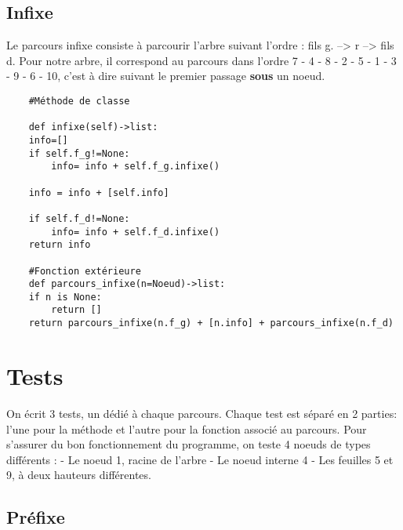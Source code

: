 \documentclass{article}
\begin{document}
\subsection{Infixe}
Le parcours infixe consiste à parcourir l'arbre suivant l'ordre : fils g. --> r --> fils d.
 Pour notre arbre, il correspond au parcours dans 
 l’ordre 7 - 4 - 8 - 2 - 5 - 1 - 3 - 9 - 6 - 10,
 c'est à dire suivant le premier passage \textbf{sous} un noeud.
\renewcommand{\theFancyVerbLine}{
  \sffamily\textcolor[rgb]{0.5,0.5,0.5}{\scriptsize\arabic{FancyVerbLine}}}

\begin{verbatim}
    #Méthode de classe

    def infixe(self)->list:
    info=[]
    if self.f_g!=None:
        info= info + self.f_g.infixe() 
         
    info = info + [self.info]
    
    if self.f_d!=None:
        info= info + self.f_d.infixe()
    return info
    
    #Fonction extérieure
    def parcours_infixe(n=Noeud)->list:
    if n is None:
        return []
    return parcours_infixe(n.f_g) + [n.info] + parcours_infixe(n.f_d)

\end{verbatim}

\section{Tests}
On écrit 3 tests, un dédié à chaque parcours.
Chaque test est séparé en 2 parties: l'une pour la méthode et l'autre pour la fonction associé au parcours.
Pour s'assurer du bon fonctionnement du programme, on teste 4 noeuds de types différents :
\newline
- Le noeud 1, racine de l'arbre
\newline
- Le noeud interne 4
\newline
- Les feuilles 5 et 9, à deux hauteurs différentes.
\subsection{Préfixe}


\renewcommand{\theFancyVerbLine}{
  \sffamily\textcolor[rgb]{0.5,0.5,0.5}{\scriptsize\arabic{FancyVerbLine}}}
\end{document}
